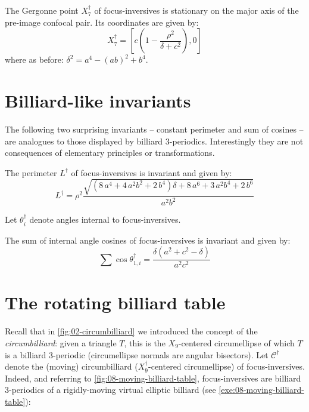 \begin{proposition}
The Gergonne point $X_7^\dagger$ of focus-inversives is stationary on the major axis of the pre-image confocal pair. Its coordinates are given by:
\[ X_7^\dagger=\left[c\left(1-\frac{\rho^2}{\delta+c^2}\right),0\right]\]
where as before: $\delta^2=a^4-(a b)^2+b^4$.
\label{prop:08-gergonne}
\end{proposition} 

\section{Billiard-like invariants}

The following two surprising invariants -- constant perimeter and sum of cosines -- are analogues to those displayed by billiard 3-periodics. Interestingly they are not consequences of elementary principles or transformations. 

\begin{proposition}
The perimeter $L^\dagger$ of focus-inversives is invariant and given by: 
\[L^\dagger=\rho^2 \frac {\sqrt { \left( 8\,{a}^{4}+4\,{a}^{2}{b}^{2}+2\,{b}^{4}
 \right) \delta+8\,{a}^{6}+3\,{a}^{2}{b}^{4}+2\,{b}^{6}}}{{a}^{2}{b}^{
2}}\]
\label{prop:08-inv-perimeter}
\end{proposition}

Let $\theta_i^\dagger$ denote angles internal to focus-inversives. 

\begin{proposition}
The sum of internal angle cosines of focus-inversives is invariant and given by: 
\[
\sum\cos{\theta_{1,i}^\dagger}=\frac{\delta (a^2+c^2-\delta)}{a^2c^2} \]
\label{prop:08-inv-cos-sum}
\end{proposition}

\section{The rotating billiard table}

Recall that in \cref{fig:02-circumbilliard} we introduced the concept of the {\em circumbilliard}: given a triangle $T$, this is the $X_9$-centered circumellipse of which $T$ is a billiard 3-periodic (circumellipse normals are angular bisectors). Let  $\mathcal{C}^\dagger$ denote the (moving) circumbilliard ($X_9^\dagger$-centered circumellipse) of focus-inversives. Indeed, and referring to \cref{fig:08-moving-billiard-table}, focus-inversives are billiard 3-periodics of a rigidly-moving virtual elliptic billiard (see \cref{exe:08-moving-billiard-table}):


